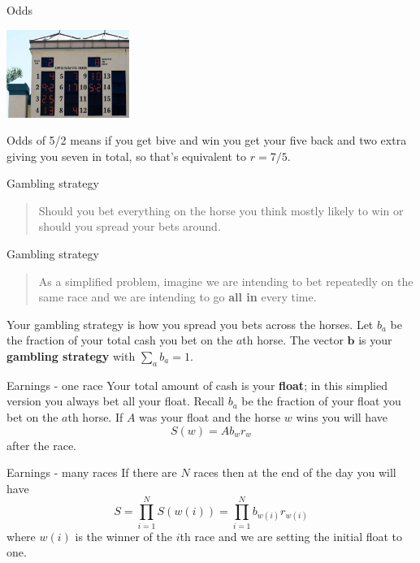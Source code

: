 \documentclass{beamer}
\newcommand{\crish}{\color{reddish}}
\newcommand{\cbla}{\color{black}}
\begin{document}
\begin{frame}{Odds}
  \begin{center}
    \includegraphics[width=4cm]{tote.jpg}
  \end{center}
Odds of \crish{}5/2\cbla{} means if you get bive and win you get your five back and two extra giving you seven in total, so that's equivalent to \crish$r=7/5$\cbla{}.
\end{frame}

\begin{frame}{Gambling strategy}
\begin{quote}
Should you bet everything on the horse you think mostly likely to win or should you spread your bets around.
  \end{quote}
\end{frame}

\begin{frame}{Gambling strategy}
\begin{quote}
  As a simplified problem, imagine we are intending to bet repeatedly on the same race and we are intending to go \textbf{all in} every time. 
\end{quote}
Your gambling strategy is how you spread you bets across the
horses. Let \crish$b_a$\cbla{} be the fraction of your total cash you bet
on the \crish$a$\cbla{}th horse. The vector \crish$\mathbf{b}$\cbla{}
is your \textbf{gambling strategy} with \crish$\sum_ab_a=1$\cbla{}.
\end{frame}
   

\begin{frame}{Earnings - one race}
Your total amount of cash is your \textbf{float}; in this simplied
version you always bet all your float.
\vskip 1cm
Recall \crish$b_a$\cbla{} be
the fraction of your float you bet on the \crish$a$\cbla{}th horse. If
\crish$A$\cbla{} was your float and the horse \crish$w$\cbla{} wins you will have
\crish$$S(w)=Ab_wr_w$$\cbla{} after the race.
\end{frame}

\begin{frame}{Earnings - many races}
If there are \crish$N$\cbla{} races then at the end of the day you will have \crish$$
S=\prod_{i=1}^N S(w(i))=\prod_{i=1}^N b_{w(i)}r_{w(i)}
  $$\cbla{}where \crish$w(i)$\cbla{} is the winner of the
  \crish$i$\cbla{}th race and we are setting the initial float to one.
\end{frame}
   
\end{document}
